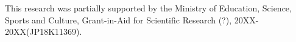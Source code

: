 \documentclass[sigchi]{acmart}
\begin{document}

\begin{acks}
This research was partially supported by the Ministry of Education, Science, Sports and Culture, Grant-in-Aid for Scientific Research (?), 20XX-20XX(JP18K11369).
\end{acks}

%



%
\end{document}
